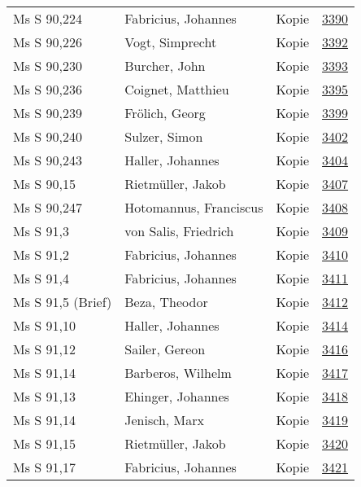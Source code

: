 \documentclass[10pt,a4paper,landscape]{report}
\begin{document}
\begin{longtable}{p{16cm}p{4cm}lr}
Ms S 90,224	&	Fabricius, Johannes	&	Kopie	&	\href{http://130.60.24.72/assignment/3390}{3390}\\
Ms S 90,226	&	Vogt, Simprecht	&	Kopie	&	\href{http://130.60.24.72/assignment/3392}{3392}\\
Ms S 90,230	&	Burcher, John	&	Kopie	&	\href{http://130.60.24.72/assignment/3393}{3393}\\
Ms S 90,236	&	Coignet, Matthieu	&	Kopie	&	\href{http://130.60.24.72/assignment/3395}{3395}\\
Ms S 90,239	&	Frölich, Georg	&	Kopie	&	\href{http://130.60.24.72/assignment/3399}{3399}\\
Ms S 90,240	&	Sulzer, Simon	&	Kopie	&	\href{http://130.60.24.72/assignment/3402}{3402}\\
Ms S 90,243	&	Haller, Johannes	&	Kopie	&	\href{http://130.60.24.72/assignment/3404}{3404}\\
Ms S 90,15	&	Rietmüller, Jakob	&	Kopie	&	\href{http://130.60.24.72/assignment/3407}{3407}\\
Ms S 90,247	&	Hotomannus, Franciscus	&	Kopie	&	\href{http://130.60.24.72/assignment/3408}{3408}\\
Ms S 91,3	&	von Salis, Friedrich	&	Kopie	&	\href{http://130.60.24.72/assignment/3409}{3409}\\
Ms S 91,2	&	Fabricius, Johannes	&	Kopie	&	\href{http://130.60.24.72/assignment/3410}{3410}\\
Ms S 91,4	&	Fabricius, Johannes	&	Kopie	&	\href{http://130.60.24.72/assignment/3411}{3411}\\
Ms S 91,5 (Brief)	&	Beza, Theodor	&	Kopie	&	\href{http://130.60.24.72/assignment/3412}{3412}\\
Ms S 91,10	&	Haller, Johannes	&	Kopie	&	\href{http://130.60.24.72/assignment/3414}{3414}\\
Ms S 91,12	&	Sailer, Gereon	&	Kopie	&	\href{http://130.60.24.72/assignment/3416}{3416}\\
Ms S 91,14	&	Barberos, Wilhelm	&	Kopie	&	\href{http://130.60.24.72/assignment/3417}{3417}\\
Ms S 91,13	&	Ehinger, Johannes	&	Kopie	&	\href{http://130.60.24.72/assignment/3418}{3418}\\
Ms S 91,14	&	Jenisch, Marx	&	Kopie	&	\href{http://130.60.24.72/assignment/3419}{3419}\\
Ms S 91,15	&	Rietmüller, Jakob	&	Kopie	&	\href{http://130.60.24.72/assignment/3420}{3420}\\
Ms S 91,17	&	Fabricius, Johannes	&	Kopie	&	\href{http://130.60.24.72/assignment/3421}{3421}\\

\end{longtable}
\end{document}
